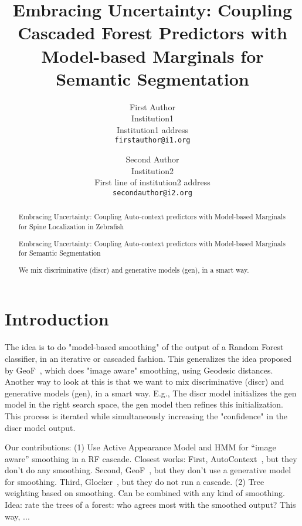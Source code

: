 \documentclass[10pt,twocolumn,letterpaper]{article}
\begin{document}
\title{Embracing Uncertainty: Coupling Cascaded Forest Predictors with
Model-based Marginals for Semantic Segmentation}

\author{First Author\\
Institution1\\
Institution1 address\\
{\tt\small firstauthor@i1.org}
\and
Second Author\\
Institution2\\
First line of institution2 address\\
{\tt\small secondauthor@i2.org}
}

\maketitle

\begin{abstract}
Embracing Uncertainty: Coupling Auto-context predictors with
Model-based Marginals for Spine Localization in Zebrafish

Embracing Uncertainty: Coupling Auto-context predictors with
Model-based Marginals for Semantic Segmentation

   We mix discriminative (discr) and generative models (gen), in a smart way.
\end{abstract}

\section{Introduction}
The idea is to do "model-based smoothing" of the output of a Random Forest classifier, in an iterative or cascaded fashion.  This generalizes the idea proposed by GeoF~\cite{GeoForests2013}, which does "image aware" smoothing, using Geodesic distances. 
%
Another way to look at this is that we want to mix discriminative (discr) and generative models (gen), in a smart way.  E.g., The discr model initializes the gen model in the right search space, the gen model then refines this initialization.  This process is iterated while simultaneously increasing the "confidence" in the discr model output. 

Our contributions: 
%
(1) Use Active Appearance Model and HMM for "`image aware"' smoothing in a RF cascade. 
Closest works: 
First, AutoContext~\cite{AutoContext2008}, but they don't do any smoothing. 
Second, GeoF~\cite{GeoForests2013}, but they don't use a generative model for smoothing. 
Third, Glocker~\cite{Glocker2013}, but they do not run a cascade. 
%
(2) Tree weighting based on smoothing. Can be combined with any kind of smoothing. Idea: rate the trees of a forest: who agrees most with the smoothed output? This way, ...
%
\end{document}
